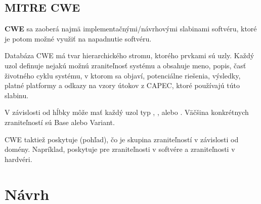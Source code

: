 \documentclass[11pt]{article}
\begin{document}
\subsection{MITRE CWE}

\textbf{CWE} sa zaoberá najmä implementačnými/návrhovými slabinami softvéru, ktoré je potom možné využiť na napadnutie softvéru.

Databáza CWE má tvar hierarchického stromu, ktorého prvkami sú uzly. Každý uzol definuje nejakú možnú zraniteľnosť systému a obsahuje meno, popis, časť životného cyklu systému, v ktorom sa objaví, potenciálne riešenia, výsledky, platné platformy a odkazy na vzory útokov z CAPEC, ktoré používajú túto slabinu.

V závislosti od hĺbky môže mať každý uzol typ , ,  alebo . Väčšina konkrétnych zraniteľností sú Base alebo Variant.

CWE taktiež poskytuje  (pohľad), čo je skupina zraniteľností v závislosti od domény. Napríklad, poskytuje  pre zraniteľnosti v softvére a zraniteľnosti v hardvéri.

\section{Návrh}
\end{document}

